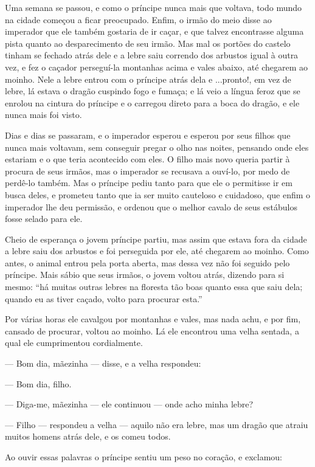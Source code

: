 Uma semana se passou, e como o príncipe nunca mais que voltava, todo
mundo na cidade começou a ficar preocupado. Enfim, o irmão do meio
disse ao imperador que ele também gostaria de ir caçar, e que talvez
encontrasse alguma pista quanto ao desparecimento de seu irmão. Mas
mal os portões do castelo tinham se fechado atrás dele e a lebre saiu
correndo dos arbustos igual à outra vez, e fez o caçador perseguí-la
montanhas acima e vales abaixo, até chegarem ao moinho. Nele a lebre
entrou com o príncipe atrás dela e ...pronto!, em vez de lebre, lá
estava o dragão cuspindo fogo e fumaça; e lá veio a língua feroz que
se enrolou na cintura do príncipe e o carregou direto para a boca do
dragão, e ele nunca mais foi visto.

Dias e dias se passaram, e o imperador esperou e esperou por seus
filhos que nunca mais voltavam, sem conseguir pregar o olho nas
noites, pensando onde eles estariam e o que teria acontecido com
eles. O filho mais novo queria partir à procura de seus irmãos, mas o
imperador se recusava a ouví-lo, por medo de perdê-lo também. Mas o
príncipe pediu tanto para que ele o permitisse ir em busca deles, e
prometeu tanto que ia ser muito cauteloso e cuidadoso, que enfim o
imperador lhe deu permissão, e ordenou que o melhor cavalo de seus
estábulos fosse selado para ele.

Cheio de esperança o jovem príncipe partiu, mas assim que estava fora
da cidade a lebre saiu dos arbustos e foi perseguida por ele, até
chegarem ao moinho. Como antes, o animal entrou pela porta aberta,
mas dessa vez não foi seguido pelo príncipe. Mais sábio que seus
irmãos, o jovem voltou atrás, dizendo para si mesmo: “há muitas
outras lebres na floresta tão boas quanto essa que saiu dela; quando
eu as tiver caçado, volto para procurar esta.”

Por várias horas ele cavalgou por montanhas e vales, mas nada achu, e
por fim, cansado de procurar, voltou ao moinho. Lá ele encontrou uma
velha sentada, a qual ele cumprimentou cordialmente.

— Bom dia, mãezinha — disse, e a velha respondeu:

— Bom dia, filho.

— Diga-me, mãezinha — ele continuou — onde acho minha lebre?

— Filho — respondeu a velha — aquilo não era lebre, mas um dragão que
atraiu muitos homens atrás dele, e os comeu todos.

Ao ouvir essas palavras o príncipe sentiu um peso no coração, e
exclamou:

